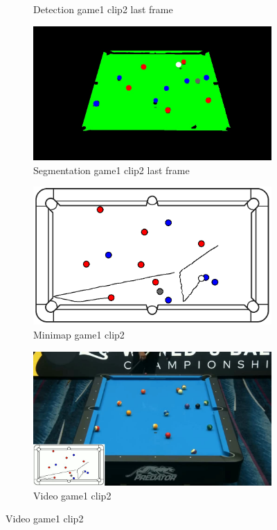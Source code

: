 \begin{figure}[H]
\begin{subfigure}[b]{0.48\textwidth}
		\caption{Detection game1 clip2 last frame}
		\label{fig: game1_clip2_last_frame_detected}
	\end{subfigure}
	\begin{subfigure}[b]{0.48\textwidth}
		\centering
		\includegraphics[width=\textwidth]{images/Segmentation/game1_clip2_segmented_balls_last_frame.jpg}
		\caption{Segmentation game1 clip2 last frame}
		\label{fig: game1_clip2_last_frame_segmented}
	\end{subfigure}
	\begin{subfigure}[b]{0.48\textwidth}
		\centering
		\includegraphics[width=\textwidth]{images/AllMinimap/game1_clip2_minimap.png}
		\caption{Minimap game1 clip2}
		\label{fig: game1_clip2_minimap}
	\end{subfigure}
	\begin{subfigure}[b]{0.48\textwidth}
		\centering
		\includegraphics[width=\textwidth]{images/Video/game1_clip2_video.jpg}
		\caption{Video game1 clip2}
		\label{fig: game1_clip2_video}
	\end{subfigure}


\end{figure}
